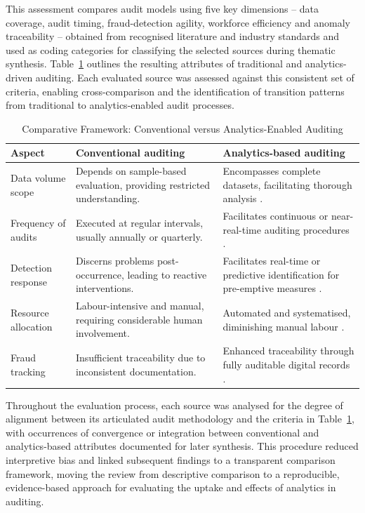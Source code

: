 \documentclass[preprint,12pt]{elsarticle}
\begin{document}
This assessment compares audit models using five key dimensions -- data coverage, audit timing, fraud-detection agility, workforce efficiency and anomaly traceability -- obtained from recognised literature and industry standards and used as coding categories for classifying the selected sources during thematic synthesis. Table~\ref{tab:framework} outlines the resulting attributes of traditional and analytics-driven auditing. Each evaluated source was assessed against this consistent set of criteria, enabling cross-comparison and the identification of transition patterns from traditional to analytics-enabled audit processes.

\begin{table}[!t]
\caption{Comparative Framework: Conventional versus Analytics-Enabled Auditing}
\label{tab:framework}
\centering
\footnotesize
\begin{tabular}{p{} p{} p{}}
\toprule
\textbf{Aspect} & \textbf{Conventional auditing} & \textbf{Analytics-based auditing} \\
\midrule
Data volume scope & Depends on sample-based evaluation, providing restricted understanding. & Encompasses complete datasets, facilitating thorough analysis \citep{faccia2024}. \\
Frequency of audits & Executed at regular intervals, usually annually or quarterly. & Facilitates continuous or near-real-time auditing procedures \citep{hassan2023}. \\
Detection response & Discerns problems post-occurrence, leading to reactive interventions. & Facilitates real-time or predictive identification for pre-emptive measures \citep{adepoju2022}. \\
Resource allocation & Labour-intensive and manual, requiring considerable human involvement. & Automated and systematised, diminishing manual labour \citep{vajpayee2023}. \\
Fraud tracking & Insufficient traceability due to inconsistent documentation. & Enhanced traceability through fully auditable digital records \citep{prosper2025}. \\
\bottomrule
\end{tabular}
\end{table}

Throughout the evaluation process, each source was analysed for the degree of alignment between its articulated audit methodology and the criteria in Table~\ref{tab:framework}, with occurrences of convergence or integration between conventional and analytics-based attributes documented for later synthesis. This procedure reduced interpretive bias and linked subsequent findings to a transparent comparison framework, moving the review from descriptive comparison to a reproducible, evidence-based approach for evaluating the uptake and effects of analytics in auditing.
\end{document}
